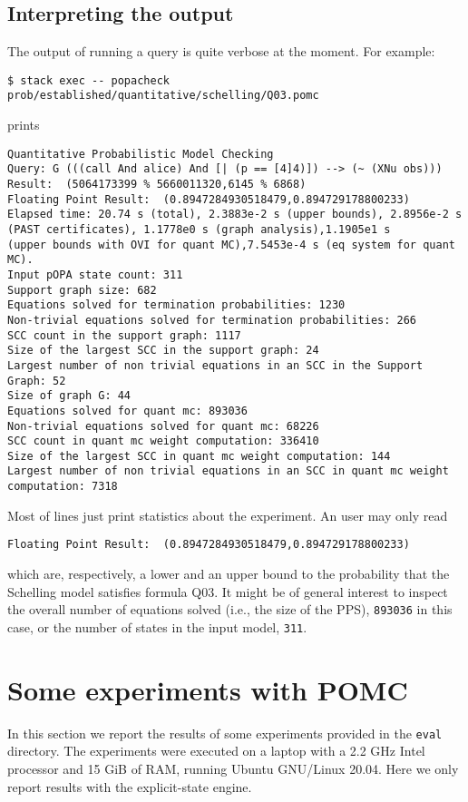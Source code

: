 \documentclass[9pt,a4paper]{article}
\begin{document}
\subsection{Interpreting the output}
\label{sec:output}
The output of running a query is quite verbose at the moment. For example: 
\begin{verbatim}
$ stack exec -- popacheck prob/established/quantitative/schelling/Q03.pomc
\end{verbatim}
prints 
\begin{verbatim}
Quantitative Probabilistic Model Checking
Query: G (((call And alice) And [| (p == [4]4)]) --> (~ (XNu obs)))
Result:  (5064173399 % 5660011320,6145 % 6868)
Floating Point Result:  (0.8947284930518479,0.894729178800233)
Elapsed time: 20.74 s (total), 2.3883e-2 s (upper bounds), 2.8956e-2 s (PAST certificates), 1.1778e0 s (graph analysis),1.1905e1 s 
(upper bounds with OVI for quant MC),7.5453e-4 s (eq system for quant MC).
Input pOPA state count: 311
Support graph size: 682
Equations solved for termination probabilities: 1230
Non-trivial equations solved for termination probabilities: 266
SCC count in the support graph: 1117
Size of the largest SCC in the support graph: 24
Largest number of non trivial equations in an SCC in the Support Graph: 52
Size of graph G: 44
Equations solved for quant mc: 893036
Non-trivial equations solved for quant mc: 68226
SCC count in quant mc weight computation: 336410
Size of the largest SCC in quant mc weight computation: 144
Largest number of non trivial equations in an SCC in quant mc weight computation: 7318

\end{verbatim}
Most of lines just print statistics about the experiment. An user may only read
\begin{verbatim}
Floating Point Result:  (0.8947284930518479,0.894729178800233)
\end{verbatim}
which are, respectively, a lower and an upper bound to the probability that the Schelling model satisfies formula Q03. It might be of general interest to inspect the overall number of equations solved (i.e., the size of the PPS), \verb|893036| in this case, or the number of states in the input model, \verb|311|.


\section{Some experiments with POMC}
\label{sec:exp}

In this section we report the results of some experiments
provided in the \texttt{eval} directory.
The experiments were executed on a laptop with a 2.2 GHz Intel processor
and 15 GiB of RAM, running Ubuntu GNU/Linux 20.04.
Here we only report results with the explicit-state engine.
\end{document}
